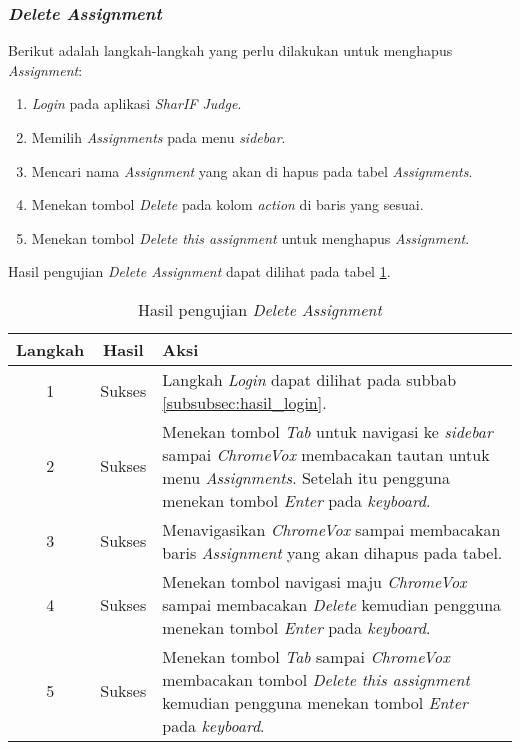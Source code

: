 \subsubsection{\textit{Delete Assignment}}
\label{subsubsec:skenario_delete_assignment}
Berikut adalah langkah-langkah yang perlu dilakukan untuk menghapus \textit{Assignment}:

\begin{enumerate}
	\item \textit{Login} pada aplikasi \textit{SharIF Judge}.
	\item Memilih \textit{Assignments} pada menu \textit{sidebar}.
	\item Mencari nama \textit{Assignment} yang akan di hapus pada tabel \textit{Assignments}.
	\item Menekan tombol \textit{Delete} pada kolom \textit{action} di baris yang sesuai.
	\item Menekan tombol \textit{Delete this assignment} untuk menghapus \textit{Assignment}.
\end{enumerate}

Hasil pengujian \textit{Delete Assignment} dapat dilihat pada tabel \ref{tab:hasil_delete_assignment}.

\begin{table}[H]
	\centering
	\caption{Hasil pengujian \textit{Delete Assignment}}
	\label{tab:hasil_delete_assignment}
	\begin{tabular}{|c|c|p{12cm}|}
		\toprule
		Langkah & Hasil & Aksi\\
		\midrule
		1 & Sukses & Langkah \textit{Login} dapat dilihat pada subbab \ref{subsubsec:hasil_login}.\\
		2 & Sukses & Menekan tombol \textit{Tab} untuk navigasi ke \textit{sidebar} sampai \textit{ChromeVox} membacakan tautan untuk menu \textit{Assignments}. Setelah itu pengguna menekan tombol \textit{Enter} pada \textit{keyboard}.\\
		3 & Sukses & Menavigasikan \textit{ChromeVox} sampai membacakan baris \textit{Assignment} yang akan dihapus pada tabel.\\
		4 & Sukses & Menekan tombol navigasi maju \textit{ChromeVox} sampai membacakan \textit{Delete} kemudian pengguna menekan tombol \textit{Enter} pada \textit{keyboard}.\\
		5 & Sukses & Menekan tombol \textit{Tab} sampai \textit{ChromeVox} membacakan tombol \textit{Delete this assignment} kemudian pengguna menekan tombol \textit{Enter} pada \textit{keyboard}.\\
		\bottomrule
	\end{tabular}
\end{table}

